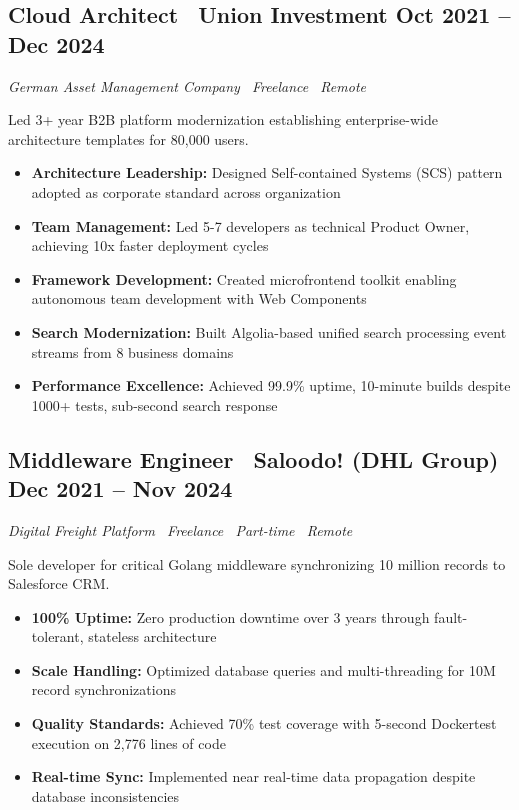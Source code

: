 \documentclass[10pt,a4paper]{article}
\begin{document}
\subsection{Cloud Architect \textbar\ Union Investment \hfill Oct 2021 -- Dec 2024}
\textit{German Asset Management Company \textbar\ Freelance \textbar\ Remote}

Led 3+ year B2B platform modernization establishing enterprise-wide architecture templates for 80,000 users.
\begin{itemize}
\item \textbf{Architecture Leadership:} Designed Self-contained Systems (SCS) pattern adopted as corporate standard across organization
\item \textbf{Team Management:} Led 5-7 developers as technical Product Owner, achieving 10x faster deployment cycles
\item \textbf{Framework Development:} Created microfrontend toolkit enabling autonomous team development with Web Components
\item \textbf{Search Modernization:} Built Algolia-based unified search processing event streams from 8 business domains
\item \textbf{Performance Excellence:} Achieved 99.9\% uptime, 10-minute builds despite 1000+ tests, sub-second search response
\end{itemize}

\subsection{Middleware Engineer \textbar\ Saloodo! (DHL Group) \hfill Dec 2021 -- Nov 2024}
\textit{Digital Freight Platform \textbar\ Freelance \textbar\ Part-time \textbar\ Remote}

Sole developer for critical Golang middleware synchronizing 10 million records to Salesforce CRM.
\begin{itemize}
\item \textbf{100\% Uptime:} Zero production downtime over 3 years through fault-tolerant, stateless architecture
\item \textbf{Scale Handling:} Optimized database queries and multi-threading for 10M record synchronizations
\item \textbf{Quality Standards:} Achieved 70\% test coverage with 5-second Dockertest execution on 2,776 lines of code
\item \textbf{Real-time Sync:} Implemented near real-time data propagation despite database inconsistencies
\end{itemize}
\end{document}
